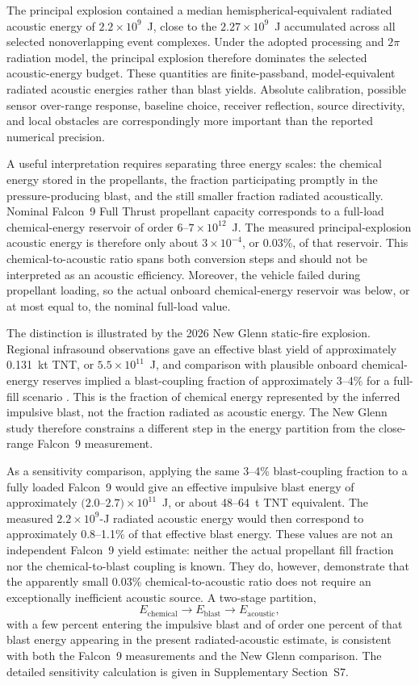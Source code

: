 \documentclass[]{seismica}
\begin{document}
The principal explosion contained a median hemispherical-equivalent radiated
acoustic energy of $2.2\times10^9$~J, close to the
$2.27\times10^9$~J accumulated across all selected nonoverlapping event
complexes. Under the adopted processing and $2\pi$ radiation model, the
principal explosion therefore dominates the selected acoustic-energy budget.
These quantities are finite-passband, model-equivalent radiated acoustic
energies rather than blast yields. Absolute calibration, possible sensor
over-range response, baseline choice, receiver reflection, source directivity,
and local obstacles are correspondingly more important than the reported
numerical precision.

A useful interpretation requires separating three energy scales:
the chemical energy stored in the propellants, the fraction participating
promptly in the pressure-producing blast, and the still smaller fraction
radiated acoustically. Nominal Falcon~9 Full Thrust propellant capacity
corresponds to a full-load chemical-energy reservoir of order
$6$--$7\times10^{12}$~J. The measured principal-explosion acoustic energy is
therefore only about $3\times10^{-4}$, or 0.03\%, of that reservoir. This
chemical-to-acoustic ratio spans both conversion steps and should not be
interpreted as an acoustic efficiency. Moreover, the vehicle failed during
propellant loading, so the actual onboard chemical-energy reservoir was below,
or at most equal to, the nominal full-load value.

The distinction is illustrated by the 2026 New Glenn static-fire explosion.
Regional infrasound observations gave an effective blast yield of approximately
0.131~kt TNT, or $5.5\times10^{11}$~J, and comparison with plausible onboard
chemical-energy reserves implied a blast-coupling fraction of approximately
3--4\% for a full-fill scenario
\citep{silber_scamfer_newglenn_2026}. This is the fraction of chemical energy
represented by the inferred impulsive blast, not the fraction radiated as
acoustic energy. The New Glenn study therefore constrains a different step in
the energy partition from the close-range Falcon~9 measurement.

As a sensitivity comparison, applying the same 3--4\% blast-coupling fraction
to a fully loaded Falcon~9 would give an effective impulsive blast energy of
approximately $(2.0$--$2.7)\times10^{11}$~J, or about 48--64~t TNT
equivalent. The measured $2.2\times10^9$-J radiated acoustic energy would then
correspond to approximately 0.8--1.1\% of that effective blast energy. These
values are not an independent Falcon~9 yield estimate: neither the actual
propellant fill fraction nor the chemical-to-blast coupling is known. They do,
however, demonstrate that the apparently small 0.03\% chemical-to-acoustic
ratio does not require an exceptionally inefficient acoustic source. A
two-stage partition,
\[
 E_{\mathrm{chemical}}
 \rightarrow E_{\mathrm{blast}}
 \rightarrow E_{\mathrm{acoustic}},
\]
with a few percent entering the impulsive blast and of order one percent of
that blast energy appearing in the present radiated-acoustic estimate, is
consistent with both the Falcon~9 measurements and the New Glenn comparison.
The detailed sensitivity calculation is given in Supplementary Section~S7.
\end{document}
